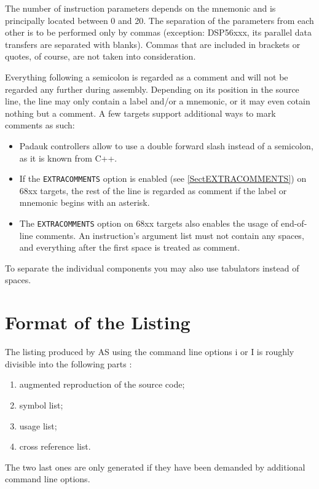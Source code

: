 \documentclass[12pt,twoside]{report}
\newcommand{\tty}[1]{{\tt #1}}
\newcommand{\asname}{{AS}}
\begin{document}
The number of instruction parameters depends on the mnemonic and is
principally located between 0 and 20.  The separation of the parameters
from each other is to be performed only by commas (exception: DSP56xxx,
its parallel data transfers are separated with blanks).  Commas that
are included in brackets or quotes, of course, are not taken into
consideration.

Everything following a semicolon is regarded as a comment and will
not be regarded any further during assembly.  Depending on its position
in the source line, the line may only contain a label and/or a mnemonic,
or it may even cotain nothing but a comment.  A few targets support
additional ways to mark comments as such:
\begin{itemize}
\item{Padauk controllers allow to use a double forward slash instead of
      a semicolon, as it is known from C++.}
\item{If the \tty{EXTRACOMMENTS} option is enabled (see \ref{SectEXTRACOMMENTS})
      on 68xx targets, the rest of the line is regarded as comment if
      the label or mnemonic begins with an asterisk.}
\item{The \tty{EXTRACOMMENTS} option on 68xx targets also enables the
      usage of end-of-line comments.  An instruction's argument list
      must not contain any spaces, and everything after the first
      space is treated as comment.}
\end{itemize}
To separate the individual components you may also use tabulators
instead of spaces.


\section{Format of the Listing}
\label{SectListing}

The listing produced by \asname{} using the command line options i or I is
roughly divisible into the following parts :
\begin{enumerate}
\item{augmented reproduction of the source code;}
\item{symbol list;}
\item{usage list;}
\item{cross reference list.}
\end{enumerate}
The two last ones are only generated if they have been demanded by
additional command line options.
\end{document}
